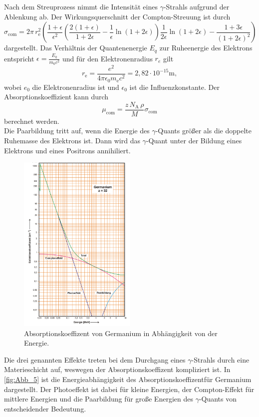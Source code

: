 Nach dem Streuprozess nimmt die Intensität eines $\gamma$-Strahls aufgrund der Ablenkung ab. 
Der Wirkungsquerschnitt der Compton-Streuung ist durch
\begin{equation}
    \sigma_\mathrm{com}=2\pi\,r_\mathrm{e}^2\left(\frac{1+\epsilon}{\epsilon^2}\left(\frac{2(1+\epsilon)}{1+2\epsilon}-\frac{1}{\epsilon}\ln(1+2\epsilon) \right)\frac{1}{2\epsilon}\ln(1+2\epsilon)-\frac{1+3\epsilon}{(1+2\epsilon)^2}\right)
    \label{eqn:sigmacom}
\end{equation}
dargestellt. Das Verhältnis der Quantenenergie $E_q$ zur Ruheenergie des Elektrons entspricht $\epsilon = \frac{E_q}{m_0c^2}$ 
und für den Elektronenradius $r_e$ gilt
\begin{equation*}
    r_\mathrm{e}=\frac{e^2}{4\pi\epsilon_0 m_\mathrm{e}c^2}=2,82\cdot10^{-15}\si{\meter},
\end{equation*}
wobei $e_0$ die Elektronenradius ist und $\epsilon_0$ ist die Influenzkonstante.
Der Absorptionskoeffizient kann durch
\begin{equation}
    \mu_\mathrm{com}=\frac{z\,N_\mathrm{A}\,\rho}{M}\sigma_\mathrm{com}
    \label{eqn:Absorptionskoeffizient}
\end{equation}
berechnet werden.\\
Die Paarbildung tritt auf, wenn die Energie des $\gamma$-Quants größer als die doppelte Ruhemasse des Elektrons ist.
Dann wird das $\gamma$-Quant unter der Bildung eines Elektrons und eines Positrons annihiliert.\\
\begin{figure}[H]
    \centering
    \includegraphics[width=0.5\textwidth]{build/Abb_5.png}
    \caption {Absorptionskoeffizent von Germanium in Abhängigkeit von der Energie\cite[236]{V704}.}
    \label{fig:Abb_5}
\end{figure}
Die drei genannten Effekte treten bei dem Durchgang eines $\gamma$-Strahls durch eine Materieschicht auf, weswegen der Absorptionskoeffizent kompliziert ist.
In \autoref{fig:Abb_5} ist die Energieabhängigkeit des Absorptionskoeffizentfür Germanium dargestellt.
Der Photoeffekt ist dabei für kleine Energien, der Compton-Effekt für mittlere Energien und die Paarbildung für große Energien des $\gamma$-Quants
von entscheidender Bedeutung.

